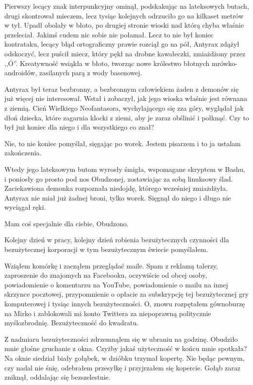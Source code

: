 Pierwszy lecący znak interpunkcyjny ominął, podskakując na lateksowych butach, drugi skontrował mieczem, lecz tysiąc kolejnych odrzuciło go na kilkaset metrów w tył.
Upadł obolały w błoto, po drugiej stronie wioski nad którą chyba właśnie przeleciał. Jakimś cudem nic sobie nie połamał.
Lecz to nie był koniec kontrataku, lecący błąd ortograficzny prawie rozciął go na pół, Antyrax zdążył odskoczyć, lecz puścił miecz, który pękł na drobne kawałeczki, zmiażdżony przez ,,Ó''.
Kreatywność wsiąkła w błoto, tworząc nowe królestwo błotnych mrówko-androidów, zasilanych parą z wody basenowej.

Antyrax był teraz bezbronny, a bezbronnym człowiekiem żaden z demonów się już więcej nie interesował. Wstał i zobaczył, jak jego wioska właśnie jest równana z ziemią.
Cień Wielkiego Neofantasora, wychylającego się zza góry, wyglądał jak dłoń dziecka, które zagarnia klocki z ziemi, aby je zaraz obślinić i połknąć.
Czy to był już koniec dla niego i dla wszystkiego co znał?

\begin{dialogue}
\ds Nie, to nie koniec \dm pomyślał, sięgając po worek. \dm Jestem pisarzem i to ja ustalam zakończenia. 
\end{dialogue}

Wtedy jego lateksowym butom wyrosły śmigła, wspomagane skryptem w Bashu, i poniosły go prosto pod nos Obudzonej, zostawiając za sobą linuksowy ślad.
Zaciekawiona demonka rozpoznała niedojdę, którego wcześniej zmiażdżyła.
Antyrax nie miał już żadnej broni, tylko worek. Sięgnął do niego i długo nie wyciągał ręki.

\ds{} Mam coś specjalnie dla ciebie, Obudzono. \de{}

\divider{}

\ds{} Kolejny dzień w pracy, kolejny dzień robienia bezużytecznych czynności dla bezużytecznej korporacji w tym bezużytecznym świecie \dm{} pomyślałem. \de{}

Wziąłem komórkę i zacząłem przeglądać maile.
Spam z reklamą talerzy, zaproszenie do znajomych na Facebooku, oczywiście od obcej osoby, powiadomienie o komentarzu na YouTube,
powiadomienie o mailu na innej skrzynce pocztowej, przypomnienie o opłacie za subskrypcję tej bezużytecznej gry komputerowej i tysiąc innych bezużyteczności.
O, znowu rozpętałem gównoburzę na Mirko i zablokowali mi konto Twittera za niepoprawną politycznie myślozbrodnię.
Bezużyteczność do kwadratu.

Z nadmiaru bezużyteczności zdrzemnąłem się w ubraniu na godzinę. Obudziło mnie głośne gruchanie z okna.
Czyżby jakaś użyteczność w końcu mnie spotkała?
Na oknie siedział biały gołąbek, w dzióbku trzymał kopertę.
Nie będąc pewnym, czy nadal nie śnię, odebrałem przesyłkę i przyjrzałem się kopercie.
Gołąb zaraz zniknął, oddalając się bezszelestnie.

